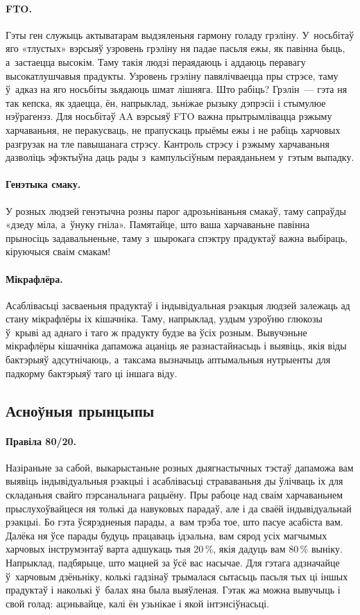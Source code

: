\paragraph{FTO.}
Гэты ген служыць актыватарам выдзяленьня гармону голаду грэліну. У~носьбітаў яго «тлустых» вэрсыяў узровень грэліну ня падае пасьля ежы, як павінна быць, а~застаецца высокім. Таму такія людзі пераядаюць і аддаюць перавагу высокатлушчавыя прадукты. Узровень грэліну павялічваецца пры стрэсе, таму ў~адказ на яго носьбіты зьядаюць шмат лішняга. Што рабіць? Грэлін~--- гэта ня так кепска, як здаецца, ён, напрыклад, зьніжае рызыку дэпрэсіі і стымулюе нэўрагенэз. Для носьбітаў AA вэрсыяў FTO важна прытрымлівацца рэжыму харчаваньня, не перакусваць, не прапускаць прыёмы ежы і не рабіць харчовых разгрузак на тле павышанага стрэсу. Кантроль стрэсу і рэжыму харчаваньня дазволіць эфэктыўна даць рады з~кампульсіўным пераяданьнем у~гэтым выпадку.

\paragraph{Генэтыка смаку.}
У розных людзей генэтычна розны парог адрозьніваньня смакаў, таму сапраўды «дзеду міла, а~ўнуку гніла». Памятайце, што ваша харчаваньне павінна прыносіць задавальненьне, таму з~шырокага спэктру прадуктаў важна выбіраць, кіруючыся сваім смакам!

\paragraph{Мікрафлёра.}
Асаблівасьці засваеньня прадуктаў і індывідуальная рэакцыя людзей залежаць ад стану мікрафлёры іх кішачніка. Таму, напрыклад, уздым узроўню глюкозы ў~крыві ад аднаго і таго ж прадукту будзе ва ўсіх розным. Вывучэньне мікрафлёры кішачніка дапаможа ацаніць яе разнастайнасьць і выявіць, якія віды бактэрыяў адсутнічаюць, а~таксама вызначыць аптымальныя нутрыенты для падкорму бактэрыяў таго ці іншага віду.

\subsection{Асноўныя прынцыпы}

\paragraph{Правіла 80/20.}
Назіраньне за сабой, выкарыстаньне розных дыягнастычных тэстаў дапаможа вам выявіць індывідуальныя рэакцыі і асаблівасьці страваваньня ды ўлічваць іх для складаньня свайго пэрсанальнага рацыёну. Пры рабоце над сваім харчаваньнем прыслухоўвайцеся ня толькі да навуковых парадаў, але і да сваёй індывідуальнай рэакцыі. Бо гэта ўсярэдненыя парады, а~вам трэба тое, што пасуе асабіста вам. Далёка ня ўсе парады будуць працаваць ідэальна, вам сярод усіх магчымых харчовых інструмэнтаў варта адшукаць тыя 20\,\%, якія дадуць вам 80\,\% выніку. Напрыклад, падбярыце, што мацней за ўсё вас насычае. Для гэтага адзначайце ў~харчовым дзёньніку, колькі гадзінаў трымалася сытасьць пасьля тых ці іншых прадуктаў і наколькі ў~балах яна была выяўленая. Гэтак жа можна вывучыць і свой голад: ацэньвайце, калі ён узьнікае і якой інтэнсіўнасьці.

